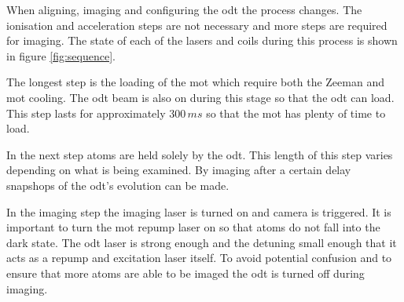 When aligning, imaging and configuring the \gls{odt} the process changes. The ionisation and acceleration steps are not necessary and more steps are required for imaging. The state of each of the lasers and coils during this process is shown in figure \ref{fig:sequence}.

The longest step is the loading of the \gls{mot} which require both the Zeeman and \gls{mot} cooling. The \gls{odt} beam is also on during this stage so that the \gls{odt} can load. This step lasts for approximately $300\,\unit{ms}$ so that the \gls{mot} has plenty of time to load. 

In the next step atoms are held solely by the \gls{odt}. This length of this step varies depending on what is being examined. By imaging after a certain delay snapshops of the \gls{odt}'s evolution can be made.

In the imaging step the imaging laser is turned on and camera is triggered. It is important to turn the \gls{mot} repump laser on so that atoms do not fall into the dark state. The \gls{odt} laser is strong enough and the detuning small enough that it acts as a repump and excitation laser itself. To avoid potential confusion and to ensure that more atoms are able to be imaged the \gls{odt} is turned off during imaging.


